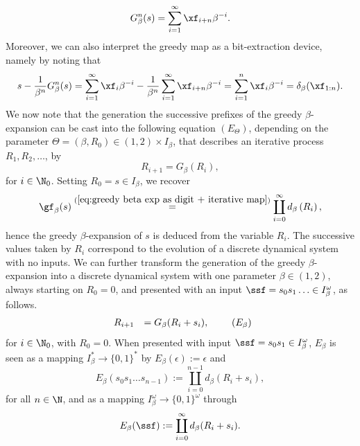 \begin{equation}\label{eq:n iterations of greedy map is same as shifting n bits}
	G^n_\beta(s) = \sum_{i=1}^\infty \xf_{i+n} \beta^{-i}.
\end{equation}
Moreover, we can also interpret the greedy map as a bit-extraction device, namely by noting that
\begin{equation}\label{eq:n iterations of greedy map is same as reading the first n bits}
	s - \frac{1}{\beta^n} G^n_\beta(s) = \sum_{i=1}^\infty \xf_i \beta^{-i} - \frac{1}{\beta^n}\sum_{i=1}^\infty \xf_{i+n} \beta^{-i} = \sum_{i=1}^n\xf_i \beta^{-i} = \delta_\beta(\xf_{1: n}).
\end{equation}
We now note that the generation the successive prefixes of the greedy $\beta$-expansion can be cast into the following equation $(E_\Theta)$, depending on the parameter $\Theta = (\beta,R_0) \in (1,2) \times I_\beta$, that describes an iterative process $R_1,R_2,\ldots$, by
\begin{equation}\label{eq:greedy map as system of equations}
		R_{i+1} = \displaystyle G_\beta(R_i),
	\tag{$E_\Theta$}
\end{equation}
for $i \in \N_0$. Setting $R_0 = s \in I_\beta$, we recover
\begin{equation}\label{eq:greedy expansion from evolution of R i}
	\gf_\beta(s) \overset{(\ref{eq:greedy beta exp as digit + iterative map})}{=} \coprod_{i=0}^\infty d_{\beta}\left(R_i\right),
\end{equation}
hence the greedy $\beta$-expansion of $s$ is deduced from the variable $R_i$. The successive values taken by $R_i$ correspond to the evolution of a discrete dynamical system with no inputs. We can further transform the generation of the greedy $\beta$-expansion into a discrete dynamical system with one parameter $\beta \in (1,2)$, always starting on $R_0 = 0$, and presented with an input $\ssf = s_0s_1\ldots \in I_\beta^\omega$, as follows. 
\begin{equation}\label{eq:greedy map as dynamical system}
	\begin{array}{rl}
		R_{i+1} &= \displaystyle G_\beta(R_i + s_i),
	\end{array}
	\tag{$E_{\beta}$}
\end{equation}
for $i \in \N_0$, with $R_0 = 0$. When presented with input $\ssf = s_0s_1 \in I_\beta^\omega$, $E_\beta$ is seen as a mapping $I_\beta^\ast \to \{0,1\}^\ast$ by $E_\beta(\epsilon) := \epsilon$ and
\begin{equation}\label{eq:inferring prefix of greedy expansion from R i E beta}
	E_\beta(s_0s_1\ldots s_{n-1}) := \coprod_{i=0}^{n-1} d_\beta(R_i + s_i), 
\end{equation}
for all $n \in \N$, and as a mapping $ I_\beta^\omega \to \{0,1\}^\omega$ through
\begin{equation}\label{eq:inferring greedy expansion from R i E beta}
	E_\beta(\ssf) := \coprod_{i=0}^{\infty} d_\beta(R_i + s_i).
\end{equation}

